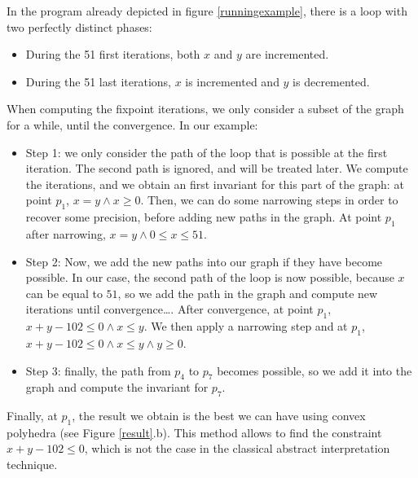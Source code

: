 \documentclass[a4paper,english,titlepage,11pt]{report}
\begin{document}
In the program already depicted in figure \ref{runningexample}, there is a loop
with two perfectly distinct phases:
\begin{itemize}
\item During the 51 first iterations, both $x$ and $y$ are incremented.
\item During the 51 last iterations, $x$ is incremented and $y$ is decremented.
\end{itemize}

When computing the fixpoint iterations, we only consider a subset of the graph
for a while, until the convergence. In our example:
\begin{itemize}
\item Step 1:
	we only consider the path of
	the loop that is possible at the first iteration. The second path is
	ignored, and will be treated later. We compute the iterations, and we obtain
	an first invariant for this part of the graph: at point $p_1$, $x =
	y \wedge x \geq 0$.
	Then, we can do some
	narrowing steps in order to recover some precision, before adding new paths
	in the graph. At point $p_1$ after narrowing, $x=y \wedge 0 \leq x \leq 51$.
\item Step 2:
	Now, we add the new paths into our graph if they have become possible. In
	our case, the second path of the loop is now possible, because $x$ can be
	equal to $51$, so we add the path in
	the graph and compute new iterations until convergence\dots. After
	convergence, at point $p_1$, $x + y - 102 \leq 0 \wedge x
	\leq y$. We then apply a narrowing step and at $p_1$, 
$x + y - 102 \leq 0 \wedge x \leq y \wedge y \geq 0$.
\item Step 3: finally, the path from $p_4$ to $p_7$ becomes possible, so we add
it into the graph and compute the invariant for $p_7$.
\end{itemize}

Finally, at $p_1$, the result we obtain is the best we can have using convex
polyhedra (see Figure \ref{result}.b). This method allows to find the
constraint $x + y - 102 \leq 0$, which is not the case in the classical abstract
interpretation technique.
\end{document}
